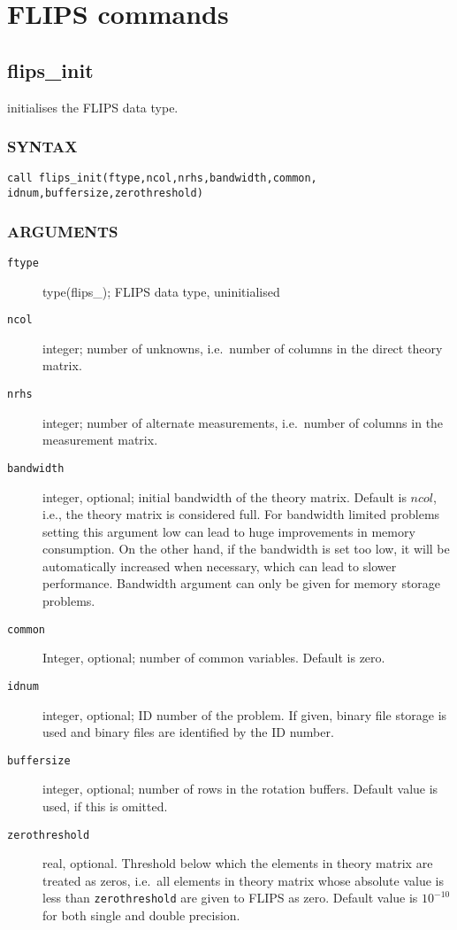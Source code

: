 \documentclass[a4paper,twoside]{refrep}
\newcommand{\code}[1]{{\tt #1}}
\newcommand{\aitem}[1]{\item[{\tt #1}]}
\newenvironment{arglist}
	{\begin{description}}
	{\end{description}}
\begin{document}
\chapter{FLIPS commands}

\section{flips\_init}

initialises the FLIPS data type.

\subsection*{SYNTAX}
\code{call flips\_init(ftype,ncol,nrhs,bandwidth,common,\\
\phantom{call flips\_init(}idnum,buffersize,zerothreshold)}

\subsection*{ARGUMENTS}
\begin{arglist}
\aitem{ftype} type(flips\_<s|d|c|z>); FLIPS data type, uninitialised
\aitem{ncol} integer; number of unknowns, i.e.\ number of columns in the direct theory matrix.
\aitem{nrhs} integer; number of alternate measurements, i.e.\ number of columns in the measurement matrix.
\aitem{bandwidth} integer, optional; initial bandwidth of the theory matrix. Default is $ncol$, i.e., the theory matrix is considered full. For bandwidth limited problems setting this argument low can lead to huge improvements in memory consumption. On the other hand, if the bandwidth is set too low, it will be automatically increased when necessary, which can lead to slower performance. Bandwidth argument can only be given for memory storage problems.
\aitem{common} Integer, optional; number of common variables. Default is zero.
\aitem{idnum} integer, optional; ID number of the problem. If given, binary file storage is used and binary files are identified by the ID number. 
\aitem{buffersize} integer, optional; number of rows in the rotation buffers. Default value is used, if this is omitted.
\aitem{zerothreshold} real, optional. Threshold below which the elements in theory matrix are treated as zeros, i.e.\ all elements in theory matrix whose absolute value is less than \verb!zerothreshold! are given to FLIPS as zero. Default value is $10^{-10}$ for both single and double precision.%
\end{arglist}
\end{document}
